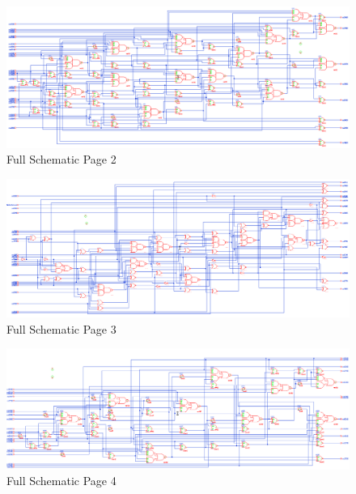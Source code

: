 \documentclass[11pt]{article}
\begin{document}
		\begin{figure}[H] 
			\centering 
			\includegraphics[width=\textwidth,height=\dimexpr\textheight-4\baselineskip-\abovecaptionskip-\belowcaptionskip\relax,keepaspectratio]{"Pictures/Full Schematic Page 2"}
			\caption{Full Schematic Page 2} 
			\label{fig:Full-Schematic-Page-2} 
		\end{figure}
	
		\begin{figure}[H] 
			\centering 
			\includegraphics[width=\textwidth,height=\dimexpr\textheight-4\baselineskip-\abovecaptionskip-\belowcaptionskip\relax,keepaspectratio]{"Pictures/Full Schematic Page 3"}
			\caption{Full Schematic Page 3} 
			\label{fig:Full-Schematic-Page-3} 
		\end{figure}
		
		
		\begin{figure}[H] 
			\centering 
			\includegraphics[width=\textwidth,height=\dimexpr\textheight-4\baselineskip-\abovecaptionskip-\belowcaptionskip\relax,keepaspectratio]{"Pictures/Full Schematic Page 4"}
			\caption{Full Schematic Page 4} 
			\label{fig:Full-Schematic-Page-4} 
		\end{figure}
		
\end{document}
